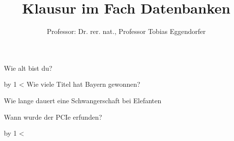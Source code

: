 \documentclass[addpoints,a4paper,ngerman,12pt,answers]{exam}
\title{Klausur im Fach Datenbanken}
\author{Professor: Dr. rer. nat., Professor Tobias Eggendorfer}
\begin{document}
\maketitle
\vspace{5cm}
\vspace{1cm}
\begin{center}
\gradetable[h][questions]
\end{center}

\newpage

\begin{questions}

\question[20]Wie alt bist du?
            \newcount\grenze
                                \newcount\Scount
        \loop\vspace*{1cm}\par\goodbreak\advance\Scount by 1 \ifnum\Scount<\grenze\repeat
        \vspace{1cm}
\question[1]Wie viele Titel hat Bayern gewonnen?
     
        \begin{checkboxes}
        
        \end{checkboxes}

        \vspace{1cm}
\question[1]Wie lange dauert eine Schwangerschaft bei Elefanten
     
        \begin{checkboxes}
        
        \end{checkboxes}

        \vspace{1cm}
\question[10]Wann wurde der PCIe erfunden?
            \newcount\grenze
                                \newcount\Scount
        \loop\vspace*{1cm}\par\goodbreak\advance\Scount by 1 \ifnum\Scount<\grenze\repeat
        \vspace{1cm}


\end{questions}
\end{document}
